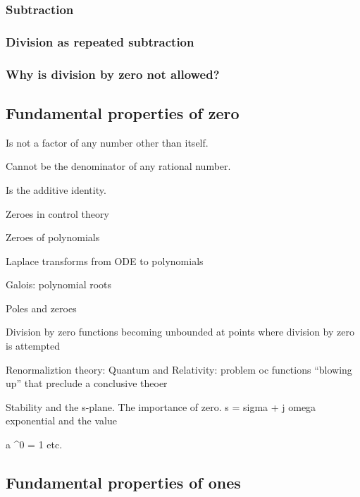 \documentclass[
  a4paper,
]{article}
\begin{document}
\hypertarget{subtraction}{%
\subsubsection{Subtraction}\label{subtraction}}

\hypertarget{division-as-repeated-subtraction}{%
\subsubsection{Division as repeated
subtraction}\label{division-as-repeated-subtraction}}

\hypertarget{why-is-division-by-zero-not-allowed}{%
\subsubsection{Why is division by zero not
allowed?}\label{why-is-division-by-zero-not-allowed}}

\hypertarget{fundamental-properties-of-zero}{%
\subsection{Fundamental properties of
zero}\label{fundamental-properties-of-zero}}

Is not a factor of any number other than itself.

Cannot be the denominator of any rational number.

Is the additive identity.

Zeroes in control theory

Zeroes of polynomials

Laplace transforms from ODE to polynomials

Galois: polynomial roots

Poles and zeroes

Division by zero functions becoming unbounded at points where division
by zero is attempted

Renormaliztion theory: Quantum and Relativity: problem oc functions
``blowing up'' that preclude a conclusive theoer

Stability and the s-plane. The importance of zero. s = sigma + j omega
exponential and the value

a \^{}0 = 1 etc.

\hypertarget{fundamental-properties-of-ones}{%
\subsection{Fundamental properties of
ones}\label{fundamental-properties-of-ones}}
\end{document}

